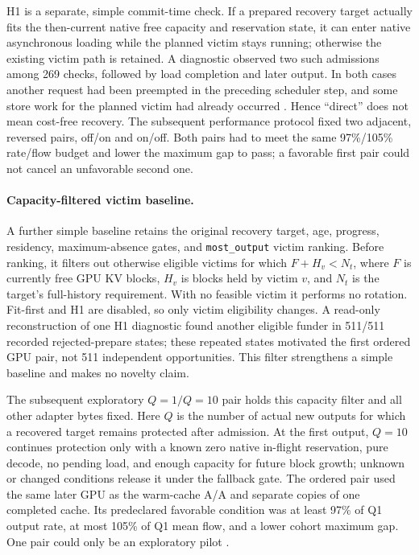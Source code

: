 \documentclass[10pt]{article}
\begin{document}
H1 is a separate, simple commit-time check. If a prepared recovery target actually fits the then-current native free capacity and reservation state, it can enter native asynchronous loading while the planned victim stays running; otherwise the existing victim path is retained. A diagnostic observed two such admissions among 269 checks, followed by load completion and later output. In both cases another request had been preempted in the preceding scheduler step, and some store work for the planned victim had already occurred \cite{h1qual}. Hence ``direct'' does not mean cost-free recovery. The subsequent performance protocol fixed two adjacent, reversed pairs, off/on and on/off. Both pairs had to meet the same 97\%/105\% rate/flow budget and lower the maximum gap to pass; a favorable first pair could not cancel an unfavorable second one.

\paragraph{Capacity-filtered victim baseline.}
A further simple baseline retains the original recovery target, age, progress, residency, maximum-absence gates, and \texttt{most\_output} victim ranking. Before ranking, it filters out otherwise eligible victims for which $F+H_v<N_t$, where $F$ is currently free GPU KV blocks, $H_v$ is blocks held by victim $v$, and $N_t$ is the target's full-history requirement. With no feasible victim it performs no rotation. Fit-first and H1 are disabled, so only victim eligibility changes. A read-only reconstruction of one H1 diagnostic found another eligible funder in 511/511 recorded rejected-prepare states; these repeated states motivated the first ordered GPU pair, not 511 independent opportunities. This filter strengthens a simple baseline and makes no novelty claim.

The subsequent exploratory $Q=1/Q=10$ pair holds this capacity filter and all other adapter bytes fixed. Here $Q$ is the number of actual new outputs for which a recovered target remains protected after admission. At the first output, $Q=10$ continues protection only with a known zero native in-flight reservation, pure decode, no pending load, and enough capacity for future block growth; unknown or changed conditions release it under the fallback gate. The ordered pair used the same later GPU as the warm-cache A/A and separate copies of one completed cache. Its predeclared favorable condition was at least 97\% of Q1 output rate, at most 105\% of Q1 mean flow, and a lower cohort maximum gap. One pair could only be an exploratory pilot \cite{capacityq}.
\end{document}

